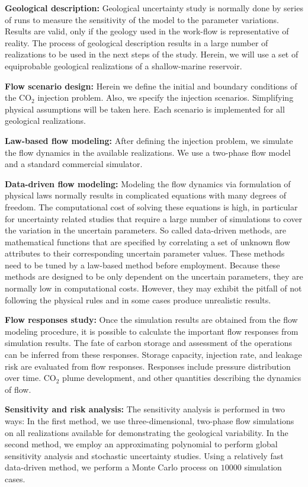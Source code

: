 \textbf{Geological description:} Geological uncertainty study is normally done
by series of runs to measure the sensitivity of the model to the parameter
variations. Results are valid, only if the geology used in the work-flow is
representative of reality. The process of geological description results in a
large number of realizations to be used in the next steps of the study. Herein, we will use a set of equiprobable geological realizations of a shallow-marine reservoir.

\textbf{Flow scenario design:} Herein we define the initial and boundary
conditions of the $\mbox{CO}_2$ injection problem. Also, we specify the
injection scenarios. Simplifying physical assumptions will be taken
here. Each scenario is implemented for all geological realizations.

\textbf{Law-based flow modeling:} After defining the injection problem, we
simulate the flow dynamics in the available realizations. We use a two-phase flow model and a standard commercial simulator.


\textbf{Data-driven flow modeling:} Modeling the flow dynamics via formulation
of physical laws normally results in complicated equations with many degrees of
freedom. The computational cost of solving these equations is high, in
particular for uncertainty related studies that require
a large number of simulations to cover the variation in the uncertain
parameters. So called data-driven methods, are mathematical functions that are specified by correlating a set of unknown flow attributes to their corresponding uncertain parameter values. These methods need to be tuned by a law-based method before employment. Because these methods are designed to be only dependent on the uncertain parameters, they are normally low in computational costs. However, they may exhibit the pitfall of not following the physical rules and in some cases produce unrealistic results. 


\textbf{Flow responses study:} Once the simulation results are obtained from the
flow modeling procedure, it is possible to calculate the important flow
responses from simulation results. The fate of carbon storage and assessment of
the operations can be inferred from these responses. Storage capacity, injection rate, and leakage risk are evaluated from flow responses. Responses include pressure distribution over time. $\mbox{CO}_2$ plume development, and other quantities describing the dynamics of flow. 

\textbf{Sensitivity and risk analysis:} The sensitivity analysis is performed
in two ways: In the first method, we use three-dimensional, two-phase flow simulations on all realizations available for demonstrating the geological variability. In the second method, we employ an
approximating polynomial to perform global sensitivity analysis and
stochastic uncertainty studies. Using a relatively fast data-driven method,
we perform a Monte Carlo process on $10000$ simulation cases. 

